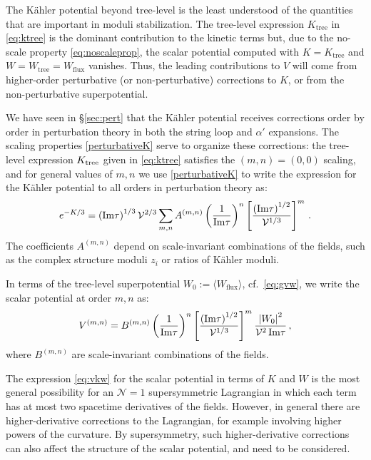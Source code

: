 \documentclass[12pt,a4wide]{article}
\def\V{\mathcal{V}}
\def\be{\begin{equation}}
\def\ee{\end{equation}}
\begin{document}
The K\"ahler potential beyond tree-level is the least understood of the 
quantities that are important in moduli stabilization. 
The tree-level expression $K_{\text{tree}}$ in \eqref{eq:ktree} is the dominant contribution to the kinetic terms but, due to the no-scale property \eqref{eq:noscaleprop}, 
the scalar potential computed with $K=K_{\text{tree}}$ and $W=W_{\text{tree}}=W_{\text{flux}}$ vanishes.
Thus, the leading contributions to $V$ will come from higher-order perturbative (or non-perturbative) corrections to $K$, or from the non-perturbative superpotential.

We have seen in \S\ref{sec:pert} that the K\"ahler potential receives corrections order by order in perturbation theory in both the string loop and $\alpha'$ expansions.  The 
scaling properties 
\eqref{perturbativeK} serve to organize these corrections:
the tree-level expression $K_{\rm {tree}}$ given in \eqref{eq:ktree} satisfies the $(m,n)=(0,0)$ scaling, and
for general values of $m,n$ we use  
\eqref{perturbativeK} to write the expression for the K\"ahler potential to all orders in perturbation theory as:
\be \label{eq:ek3}
e^{-K/3}= \left(\hbox{Im}\tau \right)^{1/3}\V^{2/3}\sum_{m,n} A^{(m,n)}\left(\frac{1}{\hbox{Im}\tau} \right)^n \left[\frac{\left(\hbox{Im}\tau\right)^{1/2}}{\V^{1/3}}\right]^m\, .
\ee
The coefficients $A^{(m,n)}$ depend on scale-invariant combinations of the fields, such as the complex structure moduli $z_i$ or ratios of K\"ahler moduli.


In terms of the tree-level superpotential $W_0:= \langle W_{\text{flux}}\rangle$, cf.~\eqref{eq:gvw}, we write the scalar potential at order $m,n$ as:
\be
V^{(m,n)}=B^{(m,n)}\left(\frac{1}{\hbox{Im}\tau} \right)^n \left[\frac{\left(\hbox{Im}\tau\right)^{1/2}}{\V^{1/3}}\right]^m \frac{\left |W_0\right |^2}{\V^2\,\hbox{Im}\tau}\, ,
\ee
where $B^{(m,n)} $ are scale-invariant combinations of the fields.

The expression \eqref{eq:vkw} for the scalar potential in terms of $K$ and $W$ is the most general possibility for an $\mathcal{N}=1$ supersymmetric Lagrangian in which each term has at most two spacetime derivatives of the fields.
However, in general there are higher-derivative corrections to the Lagrangian, for example involving higher powers of the curvature.  By supersymmetry, such higher-derivative corrections can also affect the structure of the scalar potential, and need to be considered.
\end{document}
